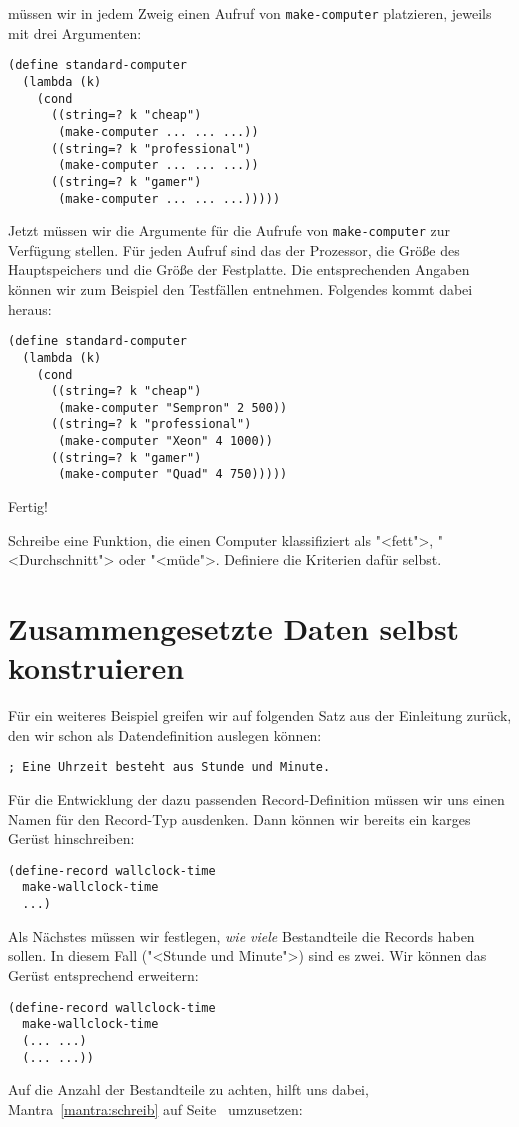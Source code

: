 müssen wir in jedem Zweig einen Aufruf von \lstinline{make-computer}
platzieren, jeweils mit drei Argumenten:
%
\begin{lstlisting}
(define standard-computer
  (lambda (k)
    (cond
      ((string=? k "cheap")
       (make-computer ... ... ...))
      ((string=? k "professional")
       (make-computer ... ... ...))
      ((string=? k "gamer")
       (make-computer ... ... ...)))))
\end{lstlisting}
%
Jetzt müssen wir die Argumente für die Aufrufe von
\lstinline{make-computer} zur Verfügung stellen.  Für jeden Aufruf sind
das der Prozessor, die Größe des Hauptspeichers und die
Größe der Festplatte.  Die entsprechenden Angaben können wir zum
Beispiel den Testfällen entnehmen.  Folgendes kommt dabei heraus:
%
\begin{lstlisting}
(define standard-computer
  (lambda (k)
    (cond
      ((string=? k "cheap")
       (make-computer "Sempron" 2 500))
      ((string=? k "professional")
       (make-computer "Xeon" 4 1000))
      ((string=? k "gamer")
       (make-computer "Quad" 4 750)))))
\end{lstlisting}
%
Fertig!

\begin{aufgabeinline}
  Schreibe eine Funktion, die einen Computer klassifiziert als
  "<fett">, "<Durchschnitt"> oder "<müde">.  Definiere die Kriterien
  dafür selbst.
\end{aufgabeinline}

\section{Zusammengesetzte Daten selbst konstruieren}

Für ein weiteres Beispiel greifen wir auf folgenden Satz aus der
Einleitung zurück, den wir schon als Datendefinition auslegen können:
%
\begin{lstlisting}
; Eine Uhrzeit besteht aus Stunde und Minute.
\end{lstlisting}
%
Für die Entwicklung der dazu passenden Record-Definition müssen wir
uns einen Namen für den Record-Typ ausdenken.  Dann können wir bereits
ein karges Gerüst hinschreiben:
%
\begin{lstlisting}
(define-record wallclock-time
  make-wallclock-time
  ...)
\end{lstlisting}
%
Als Nächstes müssen wir festlegen, \emph{wie viele} Bestandteile die
Records haben sollen.  In diesem Fall ("<Stunde und Minute">) sind es
zwei.  Wir können das Gerüst entsprechend erweitern:
%
\begin{lstlisting}
(define-record wallclock-time
  make-wallclock-time
  (... ...)
  (... ...))
\end{lstlisting}
%
Auf die Anzahl der Bestandteile zu achten, hilft uns dabei, 
Mantra~\ref{mantra:schreib} auf Seite~\pageref{mantra:schreib}
umzusetzen:


